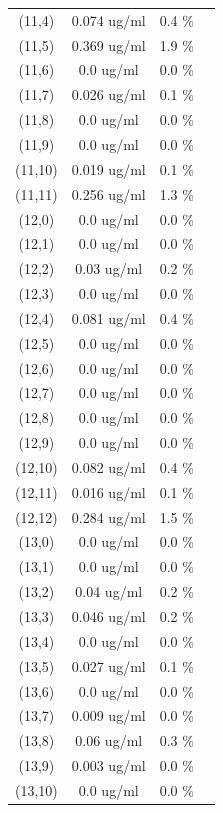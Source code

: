 \documentclass{article}
\begin{document}
\begin{tabular}{c c c c}
(11,4)&        0.074 ug/ml        &0.4 \%\\
(11,5)&        0.369 ug/ml        &1.9 \%\\
(11,6)&        0.0 ug/ml        &0.0 \%\\
(11,7)&        0.026 ug/ml        &0.1 \%\\
(11,8)&        0.0 ug/ml        &0.0 \%\\
(11,9)&        0.0 ug/ml        &0.0 \%\\
(11,10)&        0.019 ug/ml        &0.1 \%\\
(11,11)&        0.256 ug/ml        &1.3 \%\\
(12,0)&        0.0 ug/ml        &0.0 \%\\
(12,1)&        0.0 ug/ml        &0.0 \%\\
(12,2)&        0.03 ug/ml        &0.2 \%\\
(12,3)&        0.0 ug/ml        &0.0 \%\\
(12,4)&        0.081 ug/ml        &0.4 \%\\
(12,5)&        0.0 ug/ml        &0.0 \%\\
(12,6)&        0.0 ug/ml        &0.0 \%\\
(12,7)&        0.0 ug/ml        &0.0 \%\\
(12,8)&        0.0 ug/ml        &0.0 \%\\
(12,9)&        0.0 ug/ml        &0.0 \%\\
(12,10)&        0.082 ug/ml        &0.4 \%\\
(12,11)&        0.016 ug/ml        &0.1 \%\\
(12,12)&        0.284 ug/ml        &1.5 \%\\
(13,0)&        0.0 ug/ml        &0.0 \%\\
(13,1)&        0.0 ug/ml        &0.0 \%\\
(13,2)&        0.04 ug/ml        &0.2 \%\\
(13,3)&        0.046 ug/ml        &0.2 \%\\
(13,4)&        0.0 ug/ml        &0.0 \%\\
(13,5)&        0.027 ug/ml        &0.1 \%\\
(13,6)&        0.0 ug/ml        &0.0 \%\\
(13,7)&        0.009 ug/ml        &0.0 \%\\
(13,8)&        0.06 ug/ml        &0.3 \%\\
(13,9)&        0.003 ug/ml        &0.0 \%\\
(13,10)&        0.0 ug/ml        &0.0 \%\\

\end{tabular}
\end{document}
